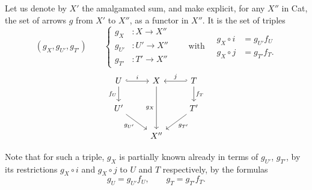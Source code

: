 \documentclass[11pt]{article}
\newcommand{\printedpage}[1]{\marginpar{\footnotesize p.~#1}}
\begin{document}
Let us denote by $X'$ the amalgamated sum, and make explicit, for any $X''$ in Cat, the set of arrows $g$ from $X'$ to $X''$, as a functor in $X''$. It is the set of triples
\[
(g_X, g_{U'}, g_{T'}) \qquad
\left\{\begin{aligned} g_X &: X \longrightarrow X'' \\ g_{U'} &: U' \longrightarrow X'' \\ g_{T'} &: T' \longrightarrow X''\end{aligned}\right.
\qquad \text{with} \quad
\begin{aligned} g_X\circ i &= g_{U'} f_U \\ g_X \circ j &= g_{T'} f_T. \end{aligned}
\tag*{$(*)$}
\]
\printedpage{49}
\[
\begin{tikzcd}
U \arrow[r, hook, "i"] \arrow[d, "f_U"'] & X \arrow[dd, "g_X"'] & T \arrow[l, hook', "j"'] \arrow[d, "f_T"] \\
U' \arrow[dr, "g_{U'}"'] & & T' \arrow[dl, "g_{T'}"] \\
& X'' &
\end{tikzcd}
\]

Note that for such a triple, $g_X$ is partially known already in terms of $g_{U'}$, $g_{T'}$, by its restrictions $g_X\circ i$ and $g_X\circ j$ to $U$ and $T$ respectively, by the formulas
\[
g_U = g_{U'}f_U, \qquad g_T = g_{T'}f_T.
\]
\end{document}
